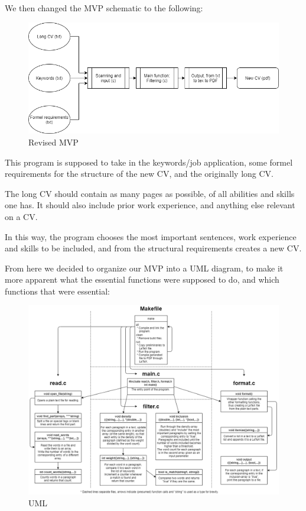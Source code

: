 We then changed the MVP schematic to the following:
\begin{figure}[H]
  \centering
  \includegraphics[scale = 0.6]{figures/Program_process_diagram.png}
  \caption{Revised MVP}
\end{figure}
This program is supposed to take in the keywords/job application, some formel requirements for
the structure of the new CV, and the originally long CV.
 
The long CV should contain as many pages as possible, of all abilities and skills one has.
It should also include prior work experience, and anything else relevant on a CV. 

In this way, the program chooses the most important sentences, work experience and skills to be included,
and from the structural requirements creates a new CV.

From here we decided to organize our MVP into a UML diagram, to make it more apparent
what the essential functions were supposed to do, and which functions that were essential:
\begin{figure}[H]
  \raggedright
  \hspace*{-1in}
  \includegraphics[scale = 0.50,left]{figures/UML}
  \caption{UML}
\end{figure}
\newpage

